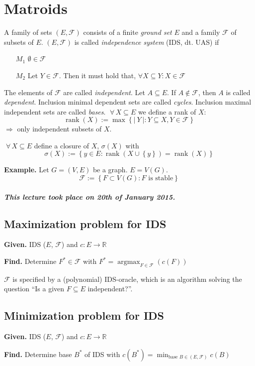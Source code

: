 \documentclass[a4paper]{article}
\theoremstyle{definition}
\newcommand{\card}[1]{\left|\:\!#1\:\!\right|}
\newcommand{\set}[1]{\left\{#1\right\}}
\newcommand{\given}[1]{\textbf{Given.} #1\par}
\newcommand{\find}[1]{\textbf{Find.} #1\par}
\newcommand{\dateref}[1]{\paragraph{\textit{This lecture took place on #1.}}}
\newcommand{\fall}{\;\forall\,}
\DeclareMathOperator{\rank}{rank}
\DeclareMathOperator{\argmax}{argmax}
\begin{document}
\section{Matroids}
%
A family of sets $(E, \mathcal{F})$ consists of a finite \emph{ground set} $E$
and a family $\mathcal{F}$ of subsets of $E$.
$(E, \mathcal{F})$ is called \emph{independence system} (IDS, dt. UAS) if
\begin{itemize}
  \item[$M_1$] $\emptyset \in \mathcal{F}$
  \item[$M_2$] Let $Y \in \mathcal{F}$. Then it must hold that, $\forall X \subseteq Y: X \in \mathcal{F}$
\end{itemize}

The elements of $\mathcal{F}$ are called \emph{independent}.
Let $A \subseteq E$. If $A \notin \mathcal{F}$, then $A$ is called \emph{dependent}.
Inclusion minimal dependent sets are called \emph{cycles}.
Inclusion maximal independent sets are called \emph{bases}.
$\fall X \subseteq E$ we define a rank of $X$:
\[ \rank(X) := \max\set{\card{Y}: Y \subseteq X, Y \in \mathcal{F}} \]
$\Rightarrow$ only independent subsets of $X$.

$\fall X \subseteq E$ define a closure of $X$, $\sigma(X)$ with
\[ \sigma(X) := \set{y \in E: \rank(X \cup \set{y}) = \rank(X)} \]

\textbf{Example.}
  Let $G = (V, E)$ be a graph. $E = V(G)$.
  \[ \mathcal{F} := \set{F \subset V(G): F \text{ is stable}} \]

\dateref{20th of January 2015}

\subsection{Maximization problem for IDS}
%
\given{IDS ($E$, $\mathcal{F}$) and $c: E \rightarrow \mathbb{R}$}
\find{Determine $F^* \in \mathcal{F}$ with $F^* = \argmax_{F \in \mathcal{F}}(c(F))$}

$\mathcal{F}$ is specified by a (polynomial) IDS-oracle, which is an algorithm solving the question \enquote{Is a given $F \subseteq E$ independent?}.

\subsection{Minimization problem for IDS}
%
\given{IDS ($E$, $\mathcal{F}$) and $c: E \rightarrow \mathbb{R}$}
\find{Determine base $B^*$ of IDS with $c(B^*) = \min_{\text{base } B \in (E, \mathcal{F})} c(B)$}
\end{document}
